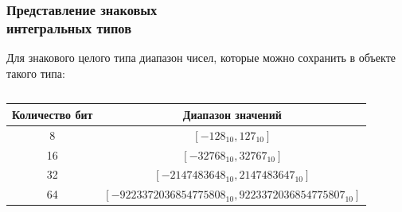 \documentclass[compress, 8pt, aspectratio=169]{beamer}
\begin{document}
\begin{frame}[fragile]

    \frametitle{Представление знаковых \\ интегральных типов}

    Для знакового целого типа диапазон чисел, которые можно
    сохранить в объекте такого типа:

    \begin{displaymath}
        [-2^{N-1}, 2^{N-1}-1]
    \end{displaymath}

    \hfill \break

    \begin{center}
        \begin{tabular}{|c|c|}
            \hline
            Количество бит & Диапазон значений \\
            \hline
            \hline
            8 & \([-128_{10},127_{10}]\) \\
            16 & \([-32768_{10},32767_{10}]\) \\
            32 & \([-2147483648_{10},2147483647_{10}]\) \\
            64 & \([-9223372036854775808_{10},9223372036854775807_{10}]\) \\
            \hline
        \end{tabular}
    \end{center}

\end{frame}
\end{document}
